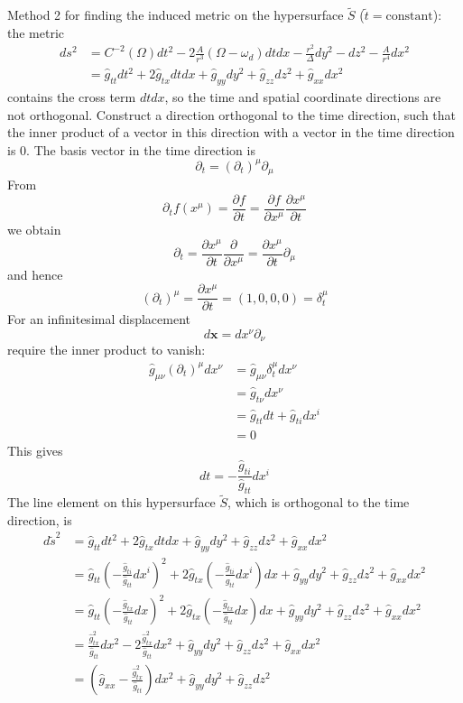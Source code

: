 \documentclass[english]{article}
\begin{document}
Method 2 for finding the induced metric on the hypersurface $\tilde{S}$
($\tilde{t}=\text{constant}$): the metric 
\begin{align*}
ds^{2} & =C^{-2}\left(\Omega\right)dt^{2}-2\frac{A}{r^{3}}\left(\Omega-\omega_{d}\right)dtdx-\frac{r^{2}}{\Delta}dy^{2}-dz^{2}-\frac{A}{r^{4}}dx^{2}\\
 & =\hat{g}_{tt}dt^{2}+2\hat{g}_{tx}dtdx+\hat{g}_{yy}dy^{2}+\hat{g}_{zz}dz^{2}+\hat{g}_{xx}dx^{2}
\end{align*}
 contains the cross term $dtdx$, so the time and spatial coordinate
directions are not orthogonal. Construct a direction orthogonal to
the time direction, such that the inner product of a vector in this
direction with a vector in the time direction is $0$. The basis vector
in the time direction is 
\[
\partial_{t}=\left(\partial_{t}\right)^{\mu}\partial_{\mu}
\]
 From 
\[
\partial_{t}f\left(x^{\mu}\right)=\frac{\partial f}{\partial t}=\frac{\partial f}{\partial x^{\mu}}\frac{\partial x^{\mu}}{\partial t}
\]
 we obtain 
\[
\partial_{t}=\frac{\partial x^{\mu}}{\partial t}\frac{\partial}{\partial x^{\mu}}=\frac{\partial x^{\mu}}{\partial t}\partial_{\mu}
\]
 and hence 
\[
\left(\partial_{t}\right)^{\mu}=\frac{\partial x^{\mu}}{\partial t}=(1,0,0,0)=\delta^{\mu}_{\!t}
\]
 For an infinitesimal displacement 
\[
d\boldsymbol{x}=dx^{\nu}\partial_{\nu}
\]
 require the inner product to vanish: 
\begin{align*}
\hat{g}_{\mu\nu}\left(\partial_{t}\right)^{\mu}dx^{\nu} & =\hat{g}_{\mu\nu}\delta^{\mu}_{\!t}dx^{\nu}\\
 & =\hat{g}_{t\nu}dx^{\nu}\\
 & =\hat{g}_{tt}dt+\hat{g}_{ti}dx^{i}\\
 & =0
\end{align*}
 This gives 
\[
dt=-\frac{\hat{g}_{ti}}{\hat{g}_{tt}}dx^{i}
\]
 The line element on this hypersurface $\tilde{S}$, which is orthogonal
to the time direction, is 
\begin{align*}
d\tilde{s}^{2} & =\hat{g}_{tt}dt^{2}+2\hat{g}_{tx}dtdx+\hat{g}_{yy}dy^{2}+\hat{g}_{zz}dz^{2}+\hat{g}_{xx}dx^{2}\\
 & =\hat{g}_{tt}\left(-\frac{\hat{g}_{ti}}{\hat{g}_{tt}}dx^{i}\right)^{2}+2\hat{g}_{tx}\left(-\frac{\hat{g}_{ti}}{\hat{g}_{tt}}dx^{i}\right)dx+\hat{g}_{yy}dy^{2}+\hat{g}_{zz}dz^{2}+\hat{g}_{xx}dx^{2}\\
 & =\hat{g}_{tt}\left(-\frac{\hat{g}_{tx}}{\hat{g}_{tt}}dx\right)^{2}+2\hat{g}_{tx}\left(-\frac{\hat{g}_{tx}}{\hat{g}_{tt}}dx\right)dx+\hat{g}_{yy}dy^{2}+\hat{g}_{zz}dz^{2}+\hat{g}_{xx}dx^{2}\\
 & =\frac{\hat{g}^{2}_{tx}}{\hat{g}_{tt}}dx^{2}-2\frac{\hat{g}^{2}_{tx}}{\hat{g}_{tt}}dx^{2}+\hat{g}_{yy}dy^{2}+\hat{g}_{zz}dz^{2}+\hat{g}_{xx}dx^{2}\\
 & =\left(\hat{g}_{xx}-\frac{\hat{g}^{2}_{tx}}{\hat{g}_{tt}}\right)dx^{2}+\hat{g}_{yy}dy^{2}+\hat{g}_{zz}dz^{2}
\end{align*}
\end{document}
